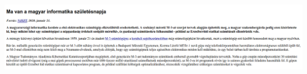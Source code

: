 \begin{frame}
  \begin{exampleblock}{}
    \scriptsize
    
  \end{exampleblock}
\end{frame}

\begin{frame}
  \begin{exampleblock}{}
    \scriptsize
    
  \end{exampleblock}
  \begin{center}
    \includegraphics[width=.9\textwidth]{egyszeruSzelektor.png}
  \end{center}
\end{frame}
